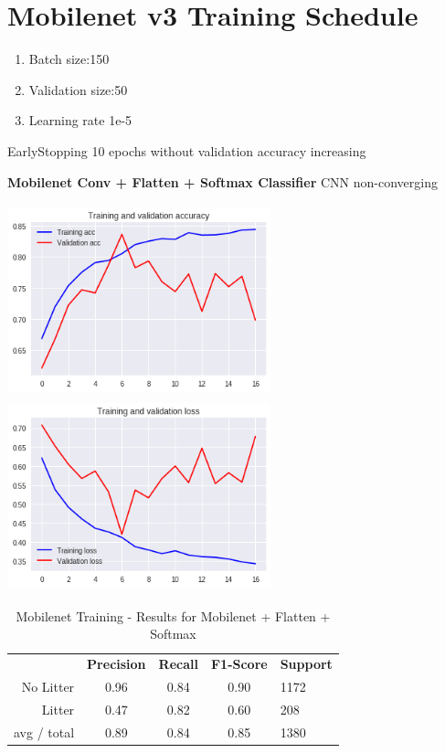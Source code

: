 \documentclass{IEEEtran}
\begin{document}
\onecolumn
\section{Mobilenet v3 Training Schedule}

\begin{enumerate}
\item Batch size:150
\item Validation size:50
\item Learning rate 1e-5
\end{enumerate}


\bigskip

EarlyStopping 10 epochs without validation accuracy increasing



\bigskip

\textbf{Mobilenet Conv + Flatten + Softmax Classifier}\newline
CNN non-converging

\bigskip


\bigskip

\includegraphics[width=3in,height=2.18in]{mobile/mobilenet-img001.png} 
\includegraphics[width=3in,height=2.18in]{mobile/mobilenet-img002.png} 


\bigskip

\begin{table}[htht]
\centering
\caption{Mobilenet Training - Results for Mobilenet + Flatten + Softmax }
\label{mobilenet1}
\begin{tabular}{rcccl}
\textbf{}   & \textbf{Precision} & \textbf{Recall} & \textbf{F1-Score} & \textbf{Support} \\
No Litter   & 0.96 &0.84 & 0.90 & 1172 \\
Litter      & 0.47 &0.82 & 0.60 & 208 \\
avg / total & 0.89 &0.84 & 0.85 & 1380 \\
\end{tabular}
\end{table}
\end{document}
